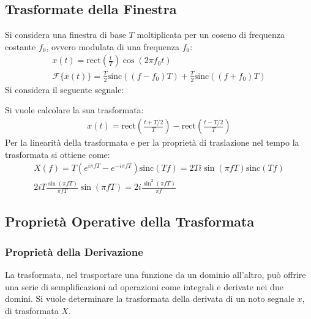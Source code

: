\documentclass{article}
\numberwithin{equation}{subsection}
\begin{document}
\subsection{Trasformate della Finestra}

Si considera una finestra di base $T$ moltiplicata per un coseno di frequenza costante $f_0$, ovvero modulata di una frequenza $f_0$:
\begin{gather*}
    x(t)=\mbox{rect}\displaystyle\left(\frac{t}{T}\right)\cos(2\pi f_0t)\\
    \mathscr{F}\{x(t)\}=\frac{T}{2}\mbox{sinc}((f-f_0)T)+\frac{T}{2}\mbox{sinc}\left((f+f_0)T\right)
\end{gather*}
Si considera il seguente segnale:
\begin{center}
\end{center}

Si vuole calcolare la sua trasformata:
\begin{gather*}
    x(t)=\mbox{rect}\left(\displaystyle\frac{t+T/2}{T}\right)-\mbox{rect}\left(\displaystyle\frac{t-T/2}{T}\right)
\end{gather*}
Per la linearità della trasformata e per la proprietà di traslazione nel tempo la trasformata si ottiene come:
\begin{gather*}
    X(f)=T\left(e^{i\pi fT}-e^{-i\pi fT}\right)\mbox{sinc}\left(T f\right)=2Ti\sin(\pi fT)\mbox{sinc}(Tf)\\
    2iT\displaystyle\frac{\sin(\pi fT)}{\pi fT}\sin(\pi fT)=2i\frac{\sin^2(\pi fT)}{\pi f}
\end{gather*}

\subsection{Proprietà Operative della Trasformata}

\subsubsection{Proprietà della Derivazione}

La trasformata, nel trasportare una funzione da un dominio all'altro, può offrire una serie di semplificazioni ad operazioni come integrali e derivate nei due domini. Si vuole 
determinare la trasformata della derivata di un noto segnale $x$, di trasformata $X$. 
\end{document}
